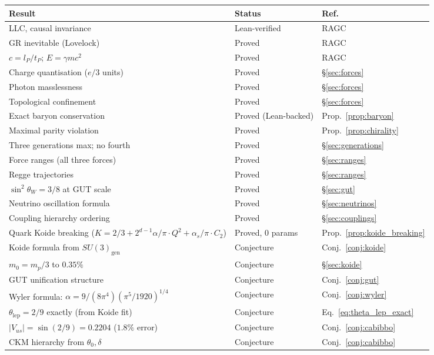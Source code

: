 \documentclass[11pt,a4paper]{article}
\begin{document}
\begin{center}
\renewcommand{\arraystretch}{1.25}
\begin{tabular}{p{5.5cm}ll}
\toprule
Result & Status & Ref. \\
\midrule
LLC, causal invariance & Lean-verified & RAGC \\
GR inevitable (Lovelock) & Proved & RAGC \\
$c = l_P/t_P$; $E = \gamma mc^2$ & Proved & RAGC \\
Charge quantisation ($e/3$ units) & Proved & \S\ref{sec:forces} \\
Photon masslessness & Proved & \S\ref{sec:forces} \\
Topological confinement & Proved & \S\ref{sec:forces} \\
Exact baryon conservation & Proved (Lean-backed) & Prop.~\ref{prop:baryon} \\
Maximal parity violation & Proved & Prop.~\ref{prop:chirality} \\
Three generations max; no fourth & Proved & \S\ref{sec:generations} \\
Force ranges (all three forces) & Proved & \S\ref{sec:ranges} \\
Regge trajectories & Proved & \S\ref{sec:ranges} \\
$\sin^2\theta_W = 3/8$ at GUT scale & Proved & \S\ref{sec:gut} \\
Neutrino oscillation formula & Proved & \S\ref{sec:neutrinos} \\
Coupling hierarchy ordering & Proved & \S\ref{sec:couplings} \\
Quark Koide breaking ($K = 2/3 + 2^{d-1}\alpha/\pi \cdot Q^2 + \alpha_s/\pi \cdot C_2$) & Proved, 0 params & Prop.~\ref{prop:koide_breaking} \\
\midrule
Koide formula from $SU(3)_{\mathrm{gen}}$ & Conjecture & Conj.~\ref{conj:koide} \\
$m_0 = m_p/3$ to $0.35\%$ & Conjecture & \S\ref{sec:koide} \\
GUT unification structure & Conjecture & Conj.~\ref{conj:gut} \\
Wyler formula: $\alpha = 9/(8\pi^4)(\pi^5/1920)^{1/4}$ & Conjecture & Conj.~\ref{conj:wyler} \\
$\theta_{\mathrm{lep}} = 2/9$ exactly (from Koide fit) & Conjecture & Eq.~\eqref{eq:theta_lep_exact} \\
$|V_{us}| = \sin(2/9) = 0.2204$ ($1.8\%$ error) & Conjecture & Conj.~\ref{conj:cabibbo} \\
CKM hierarchy from $\theta_0, \delta$ & Conjecture & Conj.~\ref{conj:cabibbo} \\

\end{tabular}
\end{center}
\end{document}

